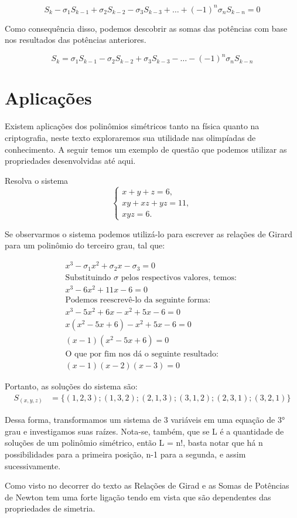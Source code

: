 \begin{equation}
	S_{k} - \sigma_{1}S_{k-1} + \sigma_{2}S_{k-2} - \sigma_{3}S_{k-3} + \dots + (-1)^{n}\sigma_{n}S_{k-n} = 0
\end{equation}

Como consequência disso, podemos descobrir as somas das potências com base nos resultados das potências anteriores.

\begin{equation}
	S_k = \sigma_{1}S_{k-1} - \sigma_{2}S_{k-2} + \sigma_{3}S_{k-3} - \dots - (-1)^{n}\sigma_{n}S_{k-n}
\end{equation}


\chapter{Aplicações}

Existem aplicações dos polinômios simétricos tanto na física quanto na criptografia, neste texto exploraremos sua utilidade nas olimpíadas de conhecimento. A seguir temos um exemplo de questão que podemos utilizar as propriedades desenvolvidas até aqui.

Resolva o sistema
$$
\begin{cases}
	x + y + z = 6, \\
	xy + xz + yz = 11, \\
	xyz = 6.
\end{cases}
$$

Se observarmos o sistema podemos utilizá-lo para escrever as relações de Girard para um polinômio do terceiro grau, tal que:

\begin{gather*}
    x^3 - \sigma_1x^2 + \sigma_2x - \sigma_3 = 0 \\
    \text{Substituindo $\sigma$ pelos respectivos valores, temos: }\\
    x^3 - 6x^2 + 11x - 6 = 0 \\
    \text{Podemos reescrevê-lo da seguinte forma: }\\
    x^3 - 5x^2 + 6x -x^2 + 5x - 6 = 0 \\
    x(x^2 - 5x + 6) -x^2 + 5x - 6 = 0 \\
    (x - 1) (x^2 - 5x + 6) = 0\\
    \text{O que por fim nos dá o seguinte resultado: } \\
    (x - 1) (x - 2) (x - 3) = 0
\end{gather*}

Portanto, as soluções do sistema são:
\begin{align*}
	S_{(x, y, z)} &= \{(1, 2, 3); (1, 3, 2); (2, 1, 3); (3, 1, 2); (2, 3, 1); (3, 2, 1)\}
\end{align*}

Dessa forma, transformamos um sistema de 3 variáveis em uma equação de 3° grau e investigamos suas raízes. Nota-se, também, que se L é a quantidade de soluções de um polinômio simétrico, então L = n!, basta notar que há n possibilidades para a primeira posição, n-1 para a segunda, e assim sucessivamente.

Como visto no decorrer do texto as Relações de Girad e as Somas de Potências de Newton tem uma forte ligação tendo em vista que são dependentes das propriedades de simetria.
